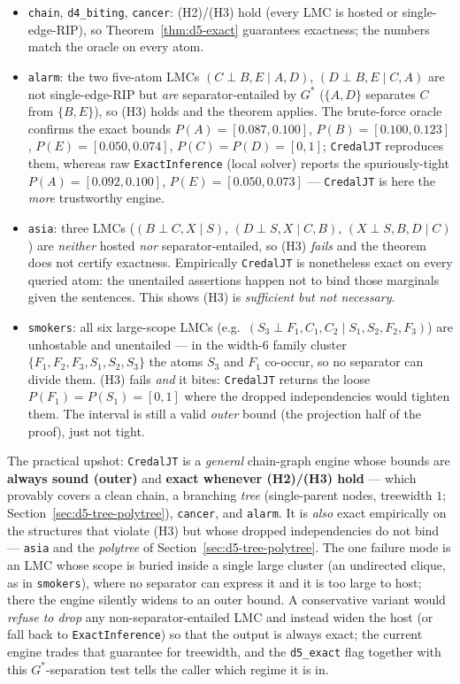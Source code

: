 \documentclass[11pt]{article}
\begin{document}
\begin{itemize}\itemsep2pt
  \item \texttt{chain}, \texttt{d4\_biting}, \texttt{cancer}: (H2)/(H3) hold (every LMC is hosted or
    single-edge-RIP), so Theorem~\ref{thm:d5-exact} guarantees exactness; the numbers match the
    oracle on every atom.
  \item \texttt{alarm}: the two five-atom LMCs $(C\perp B,E\mid A,D)$, $(D\perp B,E\mid C,A)$ are not
    single-edge-RIP but \emph{are} separator-entailed by $G^\ast$ ($\{A,D\}$ separates $C$ from
    $\{B,E\}$), so (H3) holds and the theorem applies. The brute-force oracle confirms the exact
    bounds $P(A){=}[0.087,0.100]$, $P(B){=}[0.100,0.123]$, $P(E){=}[0.050,0.074]$, $P(C){=}P(D){=}[0,1]$;
    \texttt{CredalJT} reproduces them, whereas raw \texttt{ExactInference} (local solver) reports the
    spuriously-tight $P(A){=}[0.092,0.100]$, $P(E){=}[0.050,0.073]$ --- \texttt{CredalJT} is here the
    \emph{more} trustworthy engine.
  \item \texttt{asia}: three LMCs ($(B\perp C,X\mid S)$, $(D\perp S,X\mid C,B)$, $(X\perp S,B,D\mid C)$)
    are \emph{neither} hosted \emph{nor} separator-entailed, so (H3) \emph{fails} and the theorem does
    not certify exactness. Empirically \texttt{CredalJT} is nonetheless exact on every queried atom:
    the unentailed assertions happen not to bind those marginals given the sentences. This shows (H3)
    is \emph{sufficient but not necessary}.
  \item \texttt{smokers}: all six large-scope LMCs (e.g.\ $(S_3\perp F_1,C_1,C_2\mid S_1,S_2,F_2,F_3)$)
    are unhostable and unentailed --- in the width-$6$ family cluster $\{F_1,F_2,F_3,S_1,S_2,S_3\}$ the
    atoms $S_3$ and $F_1$ co-occur, so no separator can divide them. (H3) fails \emph{and} it bites:
    \texttt{CredalJT} returns the loose $P(F_1){=}P(S_1){=}[0,1]$ where the dropped independencies would
    tighten them. The interval is still a valid \emph{outer} bound (the projection half of the proof),
    just not tight.
\end{itemize}

\noindent The practical upshot: \texttt{CredalJT} is a \emph{general} chain-graph engine whose bounds
are \textbf{always sound (outer)} and \textbf{exact whenever (H2)/(H3) hold} --- which provably covers
a clean chain, a branching \emph{tree} (single-parent nodes, treewidth $1$;
Section~\ref{sec:d5-tree-polytree}), \texttt{cancer}, and \texttt{alarm}. It is \emph{also} exact
empirically on the structures that violate (H3) but whose dropped independencies do not bind ---
\texttt{asia} and the \emph{polytree} of Section~\ref{sec:d5-tree-polytree}. The one failure mode is an
LMC whose scope is buried inside a single large cluster (an undirected clique, as in
\texttt{smokers}), where no separator can express it and it is too large to host; there the engine
silently widens to an outer bound. A conservative variant would \emph{refuse to drop} any
non-separator-entailed LMC and instead widen the host (or fall back to \texttt{ExactInference}) so
that the output is always exact; the current engine trades that guarantee for treewidth, and the
\texttt{d5\_exact} flag together with this $G^\ast$-separation test tells the caller which regime it
is in.
\end{document}
